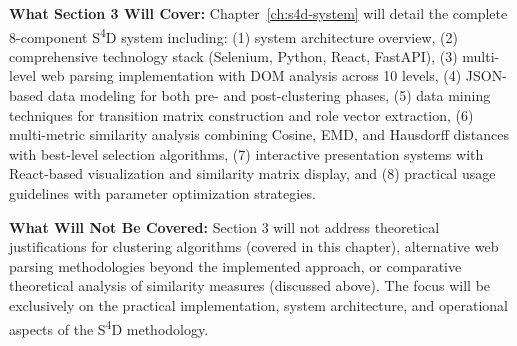 \textbf{What Section 3 Will Cover:}
Chapter~\ref{ch:s4d-system} will detail the complete 8-component S\textsuperscript{4}D system including: (1) system architecture overview, (2) comprehensive technology stack (Selenium, Python, React, FastAPI), (3) multi-level web parsing implementation with DOM analysis across 10 levels, (4) JSON-based data modeling for both pre- and post-clustering phases, (5) data mining techniques for transition matrix construction and role vector extraction, (6) multi-metric similarity analysis combining Cosine, EMD, and Hausdorff distances with best-level selection algorithms, (7) interactive presentation systems with React-based visualization and similarity matrix display, and (8) practical usage guidelines with parameter optimization strategies.

\textbf{What Will Not Be Covered:}
Section 3 will not address theoretical justifications for clustering algorithms (covered in this chapter), alternative web parsing methodologies beyond the implemented approach, or comparative theoretical analysis of similarity measures (discussed above). The focus will be exclusively on the practical implementation, system architecture, and operational aspects of the S\textsuperscript{4}D methodology. 